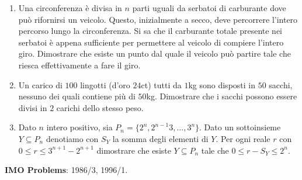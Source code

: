 \documentclass[a4paper,10pt]{article}
\begin{document}
\begin{enumerate}
	\item Una circonferenza \`e divisa in $n$ parti uguali da serbatoi di carburante dove pu\`o rifornirsi un veicolo. Questo, inizialmente a secco, deve percorrere l'intero percorso lungo la circonferenza. Si sa che il carburante totale presente nei serbatoi \`e appena sufficiente per permettere al veicolo di compiere l'intero giro. Dimostrare che esiste un punto dal quale il veicolo pu\`o partire tale che riesca effettivamente a fare il giro.

	\item Un carico di $100$ lingotti (d'oro $24$ct) tutti da $1$kg sono disposti in $50$ sacchi, nessuno dei quali contiene pi\`u di $50$kg. Dimostrare che i sacchi possono essere divisi in $2$ carichi dello stesso peso.

	\item Dato $n$ intero positivo, sia $P_n=\{2^n,2^{n-1}3,\dots,3^n\}$. Dato un sottoinsieme $Y\subseteq P_n$ denotiamo con $S_Y$ la somma degli elementi di $Y$. Per ogni reale $r$ con $0\leq r \leq 3^{n+1} -	2^{n+1}$ dimostrare che esiste $Y\subseteq P_n$ tale che $0\leq r-S_Y \leq 2^n$.

\end{enumerate}
\bigskip\bigskip

\textbf{IMO Problems}: 1986/3, 1996/1.
\end{document}
